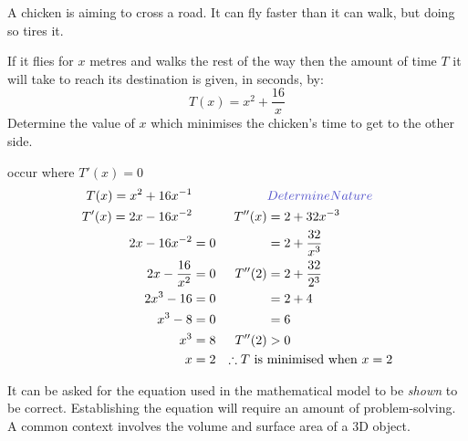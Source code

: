 \documentclass[
  11pt,
  openany]{book}
\begin{document}
\begin{tcolorbox}[title=Example 9.5.2,colback=blue!1, colframe=blue!70!black!70!]
A chicken is aiming to cross a road. It can fly faster than it can walk, but doing so tires it.
\vspace{-0.2cm}
    \begin{center}
    \end{center}
    \vspace{-0.2cm}
    If it flies for $x$ metres and walks the rest of the way then the amount of time $T$ it will take to reach its destination is given, in seconds, by:
    \vspace{-0.3cm}
    $$T(x)=x^2+\frac{16}{x}$$
    Determine the value of $x$ which minimises the chicken's time to get to the other side.

\tcblower

\textcolor{blue!70!black!70!}{} occur where $T'(x)=0$
\vspace{-0.1cm}
\begin{align*}
    T(x)=x^2+16x^{-1}&&&\textcolor{blue!70!black!70!}{Determine Nature}\\
    T'(x)=2x-16x^{-2}&&T''(x)&=2+32x^{-3}\\
    2x-16x^{-2}&=0&&=2+\frac{32}{x^3}\\
    2x-\frac{16}{x^2}&=0&T''(2)&=2+\frac{32}{2^3}\\
    2x^3-16&=0&&=2+4\\
    x^3-8&=0&&=6\\
    x^3&=8&T''(2)&>0\\
    x&=2&\therefore T\text{ is }&\text{minimised when }x=2
\end{align*}

\end{tcolorbox}

\pagebreak

It can be asked for the equation used in the mathematical model to be \textit{shown} to be correct. Establishing the equation will require an amount of problem-solving. A common context involves the volume and surface area of a 3D object.
\end{document}
